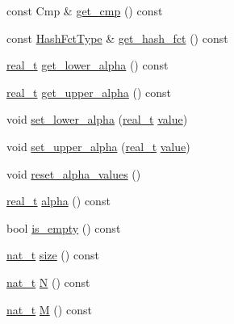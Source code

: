 \begin{DoxyCompactItemize}
const Cmp \& \hyperlink{class_designar_1_1_hash_set_a7be703ea6ba171fc58ea5b5ffd8ffa6d}{get\+\_\+cmp} () const
\item 
const \hyperlink{class_designar_1_1_hash_set_a05d8d111665c25bc17290c01fa299398}{Hash\+Fct\+Type} \& \hyperlink{class_designar_1_1_hash_set_a4cc71f53416e8cde16b1f4a76d81c9ca}{get\+\_\+hash\+\_\+fct} () const
\item 
\hyperlink{namespace_designar_aca2c32af26808dbec1f3a3071fad25ce}{real\+\_\+t} \hyperlink{class_designar_1_1_hash_set_a5bb190c4e06ee28394adb03d51cc9607}{get\+\_\+lower\+\_\+alpha} () const
\item 
\hyperlink{namespace_designar_aca2c32af26808dbec1f3a3071fad25ce}{real\+\_\+t} \hyperlink{class_designar_1_1_hash_set_a6719373d3cf21f31d53de969bd81799f}{get\+\_\+upper\+\_\+alpha} () const
\item 
void \hyperlink{class_designar_1_1_hash_set_a263b1c2f045910e13f49fb4a295fbd27}{set\+\_\+lower\+\_\+alpha} (\hyperlink{namespace_designar_aca2c32af26808dbec1f3a3071fad25ce}{real\+\_\+t} \hyperlink{namespace_designar_a7dd2a7b6d96f664ce612b506c8eb2fb8}{value})
\item 
void \hyperlink{class_designar_1_1_hash_set_a7d15d7b087df1da351a6820396ca3456}{set\+\_\+upper\+\_\+alpha} (\hyperlink{namespace_designar_aca2c32af26808dbec1f3a3071fad25ce}{real\+\_\+t} \hyperlink{namespace_designar_a7dd2a7b6d96f664ce612b506c8eb2fb8}{value})
\item 
void \hyperlink{class_designar_1_1_hash_set_a40fccab92f794f86e2d2fe602f8ffb1f}{reset\+\_\+alpha\+\_\+values} ()
\item 
\hyperlink{namespace_designar_aca2c32af26808dbec1f3a3071fad25ce}{real\+\_\+t} \hyperlink{class_designar_1_1_hash_set_a83376ba0b923d00ffbe1d12c093bc2ae}{alpha} () const
\item 
bool \hyperlink{class_designar_1_1_hash_set_a2da1b699af1bf81e0965a35c4c4b3e35}{is\+\_\+empty} () const
\item 
\hyperlink{namespace_designar_aa72662848b9f4815e7bf31a7cf3e33d1}{nat\+\_\+t} \hyperlink{class_designar_1_1_hash_set_a0026e1b2caf94d25b554cd6a399f691f}{size} () const
\item 
\hyperlink{namespace_designar_aa72662848b9f4815e7bf31a7cf3e33d1}{nat\+\_\+t} \hyperlink{class_designar_1_1_hash_set_a37cc23bf083078151f6f55b479c213ae}{N} () const
\item 
\hyperlink{namespace_designar_aa72662848b9f4815e7bf31a7cf3e33d1}{nat\+\_\+t} \hyperlink{class_designar_1_1_hash_set_ab77d2d3a6ce83395b35b9cdbbcf18c2b}{M} () const

\end{DoxyCompactItemize}
